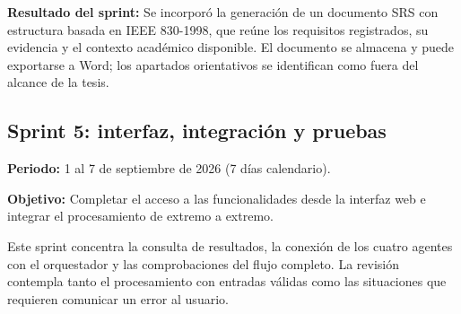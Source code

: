 \noindent\textbf{Resultado del sprint:}
Se incorporó la generación de un documento SRS
con estructura basada en IEEE 830-1998, que reúne
los requisitos registrados, su evidencia y el contexto
académico disponible. El documento se almacena y puede
exportarse a Word; los apartados orientativos se
identifican como fuera del alcance de la tesis.

\subsection{Sprint 5: interfaz, integración y pruebas}
\label{subsec:sprint-5}

\noindent\textbf{Periodo:}
1 al 7 de septiembre de 2026
(7 días calendario).

\medskip
\noindent\textbf{Objetivo:}
Completar el acceso a las funcionalidades desde
la interfaz web e integrar el procesamiento
de extremo a extremo.

Este sprint concentra la consulta de resultados,
la conexión de los cuatro agentes con el orquestador
y las comprobaciones del flujo completo.
La revisión contempla tanto el procesamiento
con entradas válidas como las situaciones
que requieren comunicar un error al usuario.

